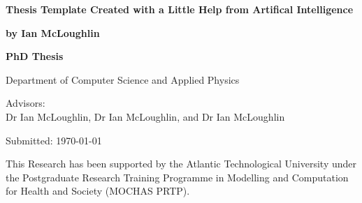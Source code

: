 
\newcommand{\thesistitle}{Thesis Template Created with a Little Help from Artifical Intelligence}
\newcommand{\thesisauthor}{by Ian McLoughlin}
\newcommand{\thesisadvisor}{Advisors:\\Dr Ian McLoughlin, Dr Ian McLoughlin, and Dr Ian McLoughlin}
\newcommand{\thesistype}{PhD Thesis}
\newcommand{\thesisdate}{Submitted: \today}
\newcommand{\thesisdepartment}{Department of Computer Science and Applied Physics}
\newcommand{\thesisfunding}{This Research has been supported by the Atlantic Technological University under the Postgraduate Research Training Programme in Modelling and Computation for Health and Society (MOCHAS PRTP).}

\begin{titlingpage}
  
  {\noindent\huge\textbf{\thesistitle}\par}
  \vspace{12mm}
  {\noindent\LARGE\textbf{\thesisauthor}\par}
  \vspace{26mm}
  {\noindent\Large\textbf{\thesistype}\par}
  \vspace{2mm}
  {\noindent\Large\thesisdepartment\par}
  \vspace{2mm}
  {\noindent\Large\thesisadvisor\par}
  \vspace{2mm}
  {\noindent\Large\thesisdate\par}
  \vspace{26mm}
  {\noindent\thesisfunding\par}


  
\end{titlingpage}